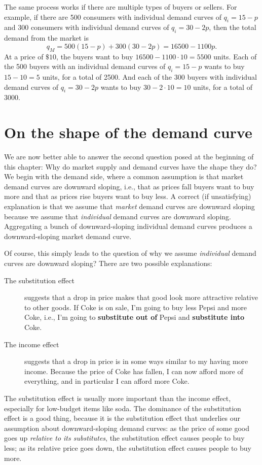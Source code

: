 The same process works if there are multiple types of buyers or sellers. For example, if there are 500 consumers with individual demand curves of $q_i=15-p$ and 300 consumers with individual demand curves of $q_i=30-2p$, then the total demand from the market is
\[
q_M=500(15-p)+300(30-2p)=16500-1100p.
\]
At a price of $\$10$, the buyers want to buy $16500-1100\cdot 10 = 5500$ units. Each of the 500 buyers with an individual demand curves of $q_i=15-p$ wants to buy $15-10=5$ units, for a total of 2500. And each of the 300 buyers with individual demand curves of $q_i=30-2p$ wants to buy $30-2\cdot 10=10$ units, for a total of 3000.






\section{On the shape of the demand curve}

We are now better able to answer the second question posed at the beginning of this chapter: Why do market supply and demand curves have the shape they do? We begin with the demand side, where a common assumption is that market demand curves are downward sloping, i.e., that as prices fall buyers want to buy more and that as prices rise buyers want to buy less. A correct (if unsatisfying) explanation is that we assume that \emph{market} demand curves are downward sloping because we assume that \emph{individual} demand curves are downward sloping. Aggregating a bunch of downward-sloping individual demand curves produces a downward-sloping market demand curve.

Of course, this simply leads to the question of why we assume \emph{individual} demand curves are downward sloping? There are two possible explanations:
\begin{description}
\item[The substitution effect] suggests that a drop in price makes that good look more attractive relative to other goods. If Coke is on sale, I'm going to buy less Pepsi and more Coke, i.e., I'm going to \textbf{substitute out of} Pepsi and \textbf{substitute into} Coke.

\item[The income effect] suggests that a drop in price is in some ways similar to my having more income. Because the price of Coke has fallen, I can now afford more of everything, and in particular I can afford more Coke.
\end{description}
%
The substitution effect is usually more important than the income effect, especially for low-budget items like soda. The dominance of the substitution effect is a good thing, because it is the substitution effect that underlies our assumption about downward-sloping demand curves: as the price of some good goes up \emph{relative to its substitutes}, the substitution effect causes people to buy less; as its relative price goes down, the substitution effect causes people to buy more.

